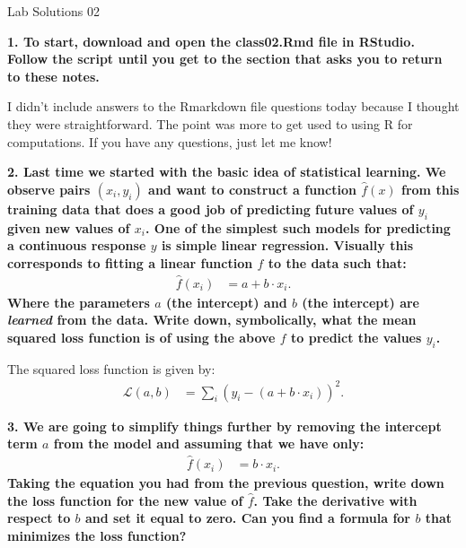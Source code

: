 \documentclass[12pt,hidelinks]{article}
\numberwithin{equation}{section}
\begin{document}
{\LARGE Lab Solutions 02}

\vspace*{12pt}

\textbf{1. To start, download and open the class02.Rmd file in RStudio.
Follow the script until you get to the section that asks you to return to
these notes.}

\vspace*{12pt}

I didn't include answers to the Rmarkdown file questions today because I
thought they were straightforward. The point was more to get used to using
R for computations. If you have any questions, just let me know!

\vspace*{12pt}

\textbf{2. Last time we started with the basic idea of statistical learning. We
observe pairs $(x_i, y_i)$ and want to construct a function $\widehat{f}(x)$ from this
training data that does a good job of predicting future values of $y_i$ given
new values of $x_i$. One of the simplest such models for predicting a
continuous response $y$ is simple linear regression. Visually this corresponds
to fitting a linear function $f$ to the data such that:}
\begin{align}
\widehat{f}(x_i) &= a + b \cdot x_i.
\end{align}
\textbf{Where the parameters $a$ (the intercept) and $b$ (the intercept) are
\textit{learned} from the data. Write down, symbolically, what the mean
squared loss function is of using the above $f$ to predict the values $y_i$.}

\vspace*{12pt}

The squared loss function is given by:
\begin{align}
\mathcal{L}(a, b) &= \sum_i \left( y_i - (a + b \cdot x_i) \right)^2.
\end{align}

\vspace*{12pt}

\textbf{3. We are going to simplify things further by removing the intercept term
$a$ from the model and assuming that we have only:}
\begin{align*}
\widehat{f}(x_i) &= b \cdot x_i.
\end{align*}
\textbf{Taking the equation you had from the previous question, write down the loss
function for the new value of $\widehat{f}$. Take the derivative with respect to $b$
and set it equal to zero. Can you find a formula for $b$ that minimizes the
loss function?}
\end{document}
